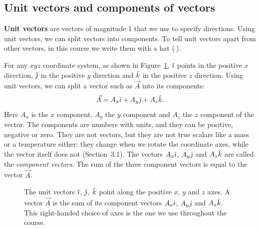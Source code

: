 \documentclass[11pt,a4paper]{article}
\begin{document}
\subsection{Unit vectors and components of vectors}\label{sec:unitvectors}

\textbf{Unit vectors} are vectors of magnitude 1 that we use to specify directions. Using unit
vectors, we can split vectors into components. To tell unit vectors apart from other vectors, in
this course we write them with a hat ($\hat{\ }$).

For any $xyz$ coordinate system, as shown in Figure~\ref{fig:unitvectors}, $\hat{\imath}$ points in the
positive $x$ direction, $\hat{\jmath}$ in the positive $y$ direction and $\hat{k}$ in the positive $z$
direction. Using unit vectors, we can split a vector such as $\vec{A}$ into its components:
\begin{equation}\label{eq:components}
  \vec{A} = A_x\hat{\imath} + A_y\hat{\jmath} + A_z\hat{k} .
\end{equation}
Here $A_x$ is the $x$ component, $A_y$ the $y$ component and $A_z$ the $z$ component of the
vector. The components are numbers with units, and they can be positive, negative or zero. They
are not vectors, but they are not true scalars like a mass or a temperature either: they change
when we rotate the coordinate axes, while the vector itself does not (Section~3.1). The vectors
$A_x\hat{\imath}$, $A_y\hat{\jmath}$ and $A_z\hat{k}$ are called the \emph{component vectors}.
The sum of the three component vectors is equal to the vector $\vec{A}$.

\begin{figure}[htb]
\centering
{}
\caption{The unit vectors $\hat{\imath}$, $\hat{\jmath}$, $\hat{k}$ point along the positive $x$, $y$ and $z$
axes. A vector $\vec{A}$ is the sum of its component vectors $A_x\hat{\imath}$, $A_y\hat{\jmath}$ and
$A_z\hat{k}$. This right-handed choice of axes is the one we use throughout the course.}
\label{fig:unitvectors}
\end{figure}
\end{document}
